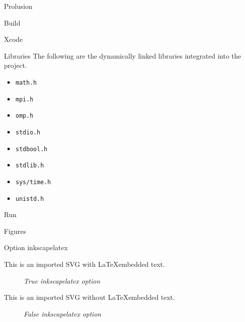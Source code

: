 \begin{chapter}{Prolusion}
\begin{section}{Build}
		\begin{subsection}{Xcode}
			\par
		\end{subsection}
		\begin{subsection}{Libraries}
			The following are the dynamically linked libraries integrated into the project.
			\begin{itemize}
				\item \texttt{math.h}
				\item \texttt{mpi.h}
				\item \texttt{omp.h}
				\item \texttt{stdio.h}
				\item \texttt{stdbool.h}
				\item \texttt{stdlib.h}
				\item \texttt{sys/time.h}
				\item \texttt{unistd.h}
			\end{itemize}
		\end{subsection}
		\begin{subsection}{Run}
		\end{subsection}
	\end{section}
    \begin{section}{Figures}
    	\begin{subsection}{Option inkscapelatex}
		\par This is an imported SVG with \LaTeX embedded text.
		\begin{figure}[ht]
			\centering
			
			\caption{\emph{True inkscapelatex option}}
			\label{fig:latexembedded}
		\end{figure}
		\par This is an imported SVG without \LaTeX embedded text.
		\begin{figure}[ht]
			\centering
			
			\caption{\emph{False inkscapelatex option}}
			\label{fig:latexnotembedded}
		\end{figure}
	\end{subsection}
    \end{section}
\end{chapter}